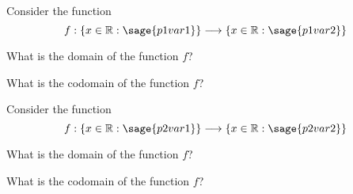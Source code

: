 \documentclass{ximeraXloud}
\begin{document}
\begin{problem}
    Consider the function 
    \[
        f:\{ x \in \mathbb{R} : \sage{p1var1} \} \longrightarrow \{ x \in \mathbb{R} : \sage{p1var2} \}
    \]
    
    What is the domain of the function $f$?
    \begin{multipleChoice}
    \end{multipleChoice}
    
    What is the codomain of the function $f$?
    
    \begin{multipleChoice}
    \end{multipleChoice}
    
\end{problem}


\begin{problem}
    Consider the function 
    \[
        f:\{ x \in \mathbb{R} : \sage{p2var1} \} \longrightarrow \{ x \in \mathbb{R} : \sage{p2var2} \}
    \]
    
    What is the domain of the function $f$?
    \begin{multipleChoice}
    \end{multipleChoice}
    
    What is the codomain of the function $f$?
    
    \begin{multipleChoice}
    \end{multipleChoice}
    
\end{problem}
\end{document}

